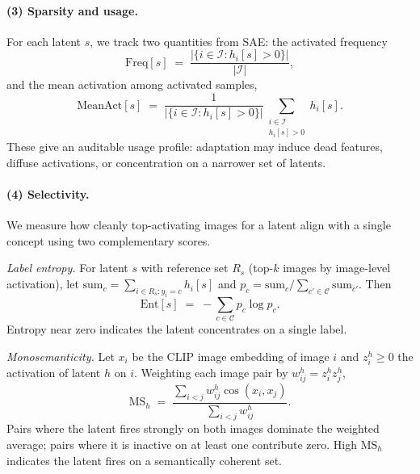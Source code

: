 \paragraph{(3) Sparsity and usage.}
For each latent $s$, we track two quantities from SAE: the activated
frequency
\begin{equation}
\mathrm{Freq}[s]
\;=\;
\frac{\left|\{i \in \mathcal{I} : h_i[s] > 0\}\right|}{|\mathcal{I}|},
\label{eq:freq}
\end{equation}
and the mean activation among activated samples,
\begin{equation}
\mathrm{MeanAct}[s]
\;=\;
\frac{1}{\left|\{i \in \mathcal{I} : h_i[s] > 0\}\right|}
\sum_{\substack{i \in \mathcal{I} \\ h_i[s] > 0}} h_i[s].
\label{eq:meanact}
\end{equation}
These give an auditable usage profile: adaptation may induce dead features,
diffuse activations, or concentration on a narrower set of latents.

\paragraph{(4) Selectivity.}
We measure how cleanly top-activating images for a latent align with a
single concept using two complementary scores.

\emph{Label entropy.} For latent $s$ with reference set $R_s$ (top-$k$
images by image-level activation), let
$\mathrm{sum}_c = \sum_{i \in R_s : y_i = c} h_i[s]$ and
$p_c = \mathrm{sum}_c / \sum_{c' \in \mathcal{C}} \mathrm{sum}_{c'}$. Then
\begin{equation}
\mathrm{Ent}[s]
\;=\;
-\sum_{c \in \mathcal{C}} p_c \log p_c.
\label{eq:entropy}
\end{equation}
Entropy near zero indicates the latent concentrates on a single label.

\emph{Monosemanticity.} Let $x_i$ be the CLIP image embedding of image $i$
and $z_i^{h} \geq 0$ the activation of latent $h$ on $i$. Weighting each
image pair by $w_{ij}^{h} = z_i^{h} z_j^{h}$,
\begin{equation}
\mathrm{MS}_h
\;=\;
\frac{\sum_{i<j} w_{ij}^{h} \cos(x_i, x_j)}{\sum_{i<j} w_{ij}^{h}}.
\label{eq:monosemanticity}
\end{equation}
Pairs where the latent fires strongly on both images dominate the weighted
average; pairs where it is inactive on at least one contribute zero. High
$\mathrm{MS}_h$ indicates the latent fires on a semantically coherent set.

